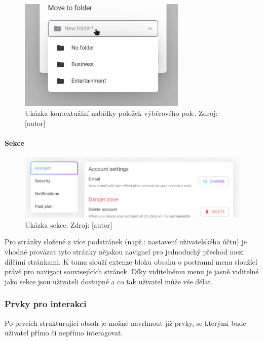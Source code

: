 			\begin{figure}[H]
				\centering
				\includegraphics[width=8cm]{obrazky/kontextualni_nabidka_vyberove_pole_ukazka}\hfill
				\caption{Ukázka kontextuální nabídky položek výběrového pole. Zdroj: [autor]}
			\end{figure}

			\paragraph{Sekce}

			\begin{figure}[H]
				\centering
				\includegraphics[width=\linewidth]{obrazky/sekce}\hfill
				\caption{Ukázka sekce. Zdroj: [autor]}
			\end{figure}

			Pro stránky složené z více podstránek (např.: nastavení uživatelského účtu) je vhodné provázat tyto stránky
			nějakou navigací pro jednoduchý přechod mezi dílčími stránkami.
			K tomu slouží extenze bloku obsahu o postranní menu sloužící právě pro navigaci souvisejících stránek.
			Díky viditelnému menu je jasně viditelné jako sekce jsou uživateli dostupné a co tak uživatel může vše dělat.

		\subsubsection{Prvky pro interakci}

		Po prvcích strukturující obsah je možné navrhnout již prvky, se kterými bude uživatel přímo či nepřímo interagovat.

